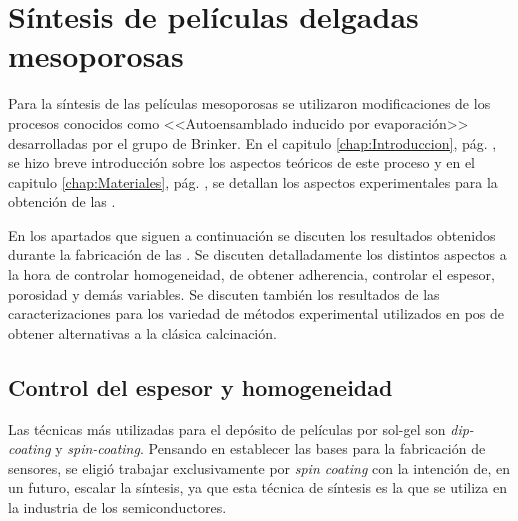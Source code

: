 
\section{Síntesis de películas delgadas mesoporosas}
		
		Para la síntesis de las películas mesoporosas se utilizaron modificaciones de los procesos conocidos como <<Autoensamblado inducido por evaporación>> desarrolladas por el grupo de Brinker.\cite{Brinker1999} En el capitulo \ref{chap:Introduccion}, pág. \pageref{sec:mesoporosos}, se hizo breve introducción sobre los aspectos teóricos de este proceso y en el capitulo \ref{chap:Materiales}, pág. \pageref{sec:sintesis_mesoporosos}, se detallan los aspectos experimentales para la obtención de las \pdm.

		En los apartados que siguen a continuación se discuten los resultados obtenidos durante la fabricación de las \pdm. Se discuten detalladamente los distintos aspectos a la hora de controlar homogeneidad, de obtener adherencia, controlar el espesor, porosidad y demás variables. Se discuten también los resultados de las caracterizaciones para los variedad de métodos experimental utilizados en pos de obtener alternativas a la clásica calcinación.

	\subsection{Control del espesor y homogeneidad}
		
		Las técnicas más utilizadas para el depósito de películas por sol-gel son \textit{dip-coating} y \textit{spin-coating}. 
		Pensando en establecer las bases para la fabricación de sensores, se eligió trabajar exclusivamente por \textit{spin coating} con la intención de, en un futuro, escalar la síntesis, ya que esta técnica de síntesis es la que se utiliza en la industria de los semiconductores.\cite{Franssila2004,Jaeger2001}

